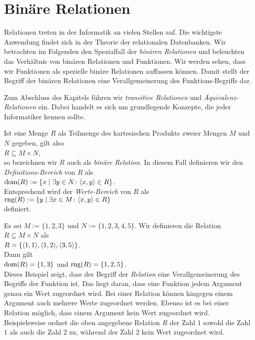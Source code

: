 
\chapter{Bin\"{a}re Relationen}
Relationen treten in der Informatik an vielen Stellen auf.  Die wichtigste
Anwendung findet sich in der Theorie der relationalen Datenbanken.
Wir betrachten im Folgenden den Spezialfall der \emph{bin\"{a}ren Relationen} und beleuchten
das Verh\"{a}ltnis von bin\"{a}ren Relationen und Funktionen. Wir werden sehen, dass wir
Funktionen als spezielle bin\"{a}re Relationen auffassen k\"{o}nnen.  Damit stellt der Begriff der
bin\"{a}ren Relationen eine Verallgemeinerung des Funktions-Begriffs dar.

Zum Abschluss des Kapitels f\"{u}hren wir \emph{transitive Relationen} und
\emph{\"{A}quivalenz-Relationen} ein.  Dabei handelt es sich um grundlegende Konzepte, die jeder Informatiker
kennen sollte.

Ist eine Menge $R$ als Teilmenge des kartesischen Produkts zweier Mengen $M$ und $N$ gegeben, gilt
also \\[0.2cm]
\hspace*{1.3cm} $R \subseteq M \times N$, \\[0.2cm]
so bezeichnen wir $R$ auch als \emph{bin\"{a}re Relation}.  In diesem Fall definieren wir den
\emph{Definitions-Bereich} von $R$ als \\[0.2cm]
\hspace*{1.3cm} $\textrm{dom}(R) := \{ x \mid \exists y \in N \colon \langle x, y \rangle \in R \}$.  
\\[0.2cm]
Entsprechend wird der \emph{Werte-Bereich} von $R$ als \\[0.2cm]
\hspace*{1.3cm} $\textrm{rng}(R) := \{ y \mid \exists x \in M \colon \langle x, y \rangle \in R\}$ \\[0.2cm]
definiert.  

\example
Es sei $M := \{1,2,3\}$ und $N := \{1,2,3,4,5\}$.  Wir definieren die Relation $R \subseteq M \times N$ 
als
\\[0.2cm]
\hspace*{1.3cm}
 $R = \{ \pair(1,1), \pair(1,2), \pair(3,5) \}$.  
\\[0.2cm]
Dann gilt 
\\[0.2cm]
\hspace*{1.3cm} $\textrm{dom}(R) = \{1,3\}$ \quad und \quad $\textrm{rng}(R) = \{1,2,5\}$. 
\\[0.2cm]
Dieses Beispiel zeigt, dass der Begriff der \emph{Relation} eine Verallgemeinerung des Begriffs
der Funktion ist.  Das liegt daran, dass eine Funktion jedem Argument genau ein Wert zugeordnet
wird.  Bei einer Relation k\"{o}nnen hingegen einem Argument auch mehrere Werte zugeordnet werden.
Ebenso ist es bei einer Relation m\"{o}glich, dass einem Argument kein Wert zugeordnet wird.
Beispielsweise ordnet die oben angegebene Relation $R$ der Zahl $1$ sowohl die Zahl $1$ als auch die
Zahl $2$ zu, w\"{a}hrend der Zahl $2$ kein Wert zugeordnet wird.
\eox

